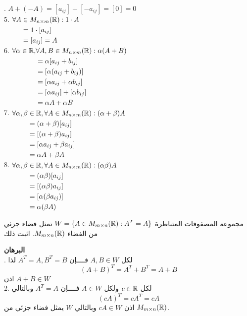 . $A + (-A) = [a_{ij}] + [-a_{ij}] = [0] =0$  \\
5. $
\begin{aligned}[t]
	\forall A &\in M_{n\times m}(\mathbb{R}) : 1\cdot A\\
	&= 1\cdot [a_{ij}]\\
	&= [a_{ij}] =A
\end{aligned}
$\\
6. $
\begin{aligned}[t]
	\forall\alpha\in\mathbb{R}, &\forall A, B\in M_{n\times m}(\mathbb{R}) : \alpha(A+B)\\
	&= \alpha [a_{ij}+b_{ij}]\\
	&= [\alpha (a_{ij} + b_{ij})]\\
	&= [\alpha a_{ij} + \alpha b_{ij}]\\
	&= [\alpha a_{ij} ] + [\alpha b_{ij}]\\
	&= \alpha A + \alpha B
\end{aligned}
$\\
7. $
\begin{aligned}[t]
	\forall \alpha, \beta &\in \mathbb{R}, \forall A\in M_{n\times m}(\mathbb{R}) : (\alpha+\beta)A\\
	&= (\alpha+\beta) [a_{ij}]\\
	&= [(\alpha+\beta)a_{ij}]\\
	&= [\alpha a_{ij} + \beta a_{ij}]\\
	&= \alpha A + \beta A
\end{aligned}
$\\
8. $
\begin{aligned}[t]
	\forall \alpha, \beta &\in \mathbb{R}, \forall A\in M_{n\times m}(\mathbb{R}) : (\alpha\beta)A\\
	&= (\alpha\beta) [a_{ij}]\\
	&= [(\alpha\beta)a_{ij}]\\
	&= [\alpha(\beta a_{ij})]\\
	&= \alpha (\beta A)
\end{aligned}
$
\begin{example}
	مجموعة المصفوفات المتناظرة
	 $W=\{A\in M_{m\times n}(\mathbb{R}) : A^T = A\}$
	 تمثل فضاء جزئي من الفضاء $M_{m\times n}(\mathbb{R})$. اثبت ذلك
\end{example}
\noindent
\textbf{البرهان}\\
. لكل $A, B\in W$ فــــإن $A^T=A, B^T=B$ لذا 
\[
(A+B)^T = A^T + B^T = A+B
\]
اذن $A+B\in W$ \\
2. لكل $c\in\mathbb{R}$ ولكل $A\in W$ فــــإن $A^T=A$ وبالتالي
\[
(cA)^T = cA^T = cA
\]
اذن $cA \in W$ وبالتالي $W$ يمثل فضاء جزئي من $M_{m\times n}(\mathbb{R})$.



